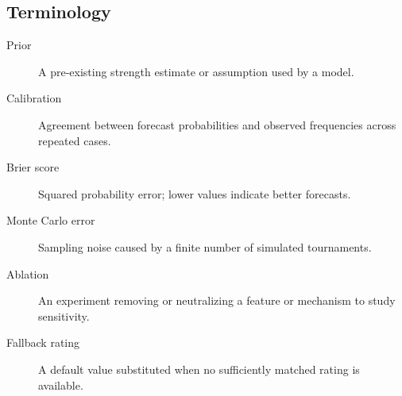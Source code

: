 \subsection{Terminology}
\begin{description}
\item[Prior] A pre-existing strength estimate or assumption used by a model.
\item[Calibration] Agreement between forecast probabilities and observed frequencies across repeated cases.
\item[Brier score] Squared probability error; lower values indicate better forecasts.
\item[Monte Carlo error] Sampling noise caused by a finite number of simulated tournaments.
\item[Ablation] An experiment removing or neutralizing a feature or mechanism to study sensitivity.
\item[Fallback rating] A default value substituted when no sufficiently matched rating is available.
\end{description}

